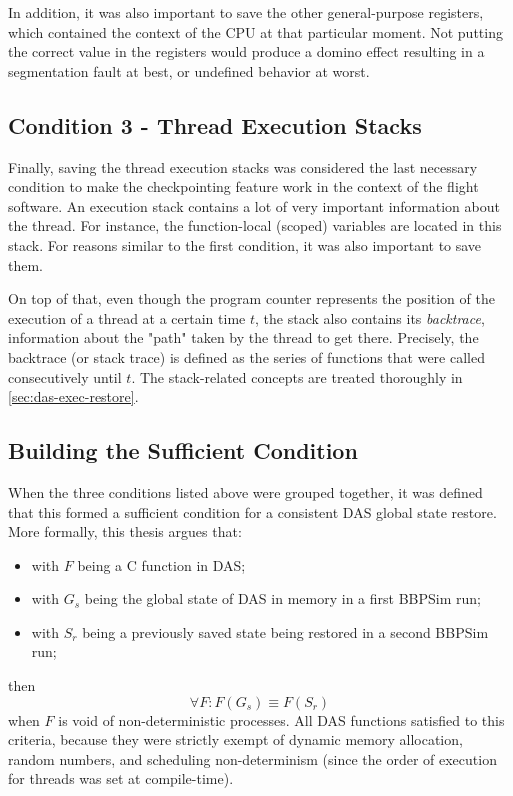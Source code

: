 {In addition, it was also important to save the other general-purpose registers, which contained the context of the CPU at that particular moment. Not putting the correct value in the registers would produce a domino effect resulting in a segmentation fault at best, or undefined behavior at worst.

\subsection*{Condition 3 - Thread Execution Stacks}
Finally, saving the thread execution stacks was considered the last necessary condition to make the checkpointing feature work in the context of the flight software. An execution stack contains a lot of very important information about the thread. For instance, the function-local (scoped) variables are located in this stack. For reasons similar to the first condition, it was also important to save them.

On top of that, even though the program counter represents the position of the execution of a thread at a certain time $t$, the stack also contains its \textit{backtrace}, information about the "path" taken by the thread to get there. Precisely, the backtrace (or stack trace) is defined as the series of functions that were called consecutively until $t$. The stack-related concepts are treated thoroughly in \autoref{sec:das-exec-restore}.

\subsection*{Building the Sufficient Condition}
When the three conditions listed above were grouped together, it was defined that this formed a sufficient condition for a consistent DAS global state restore. More formally, this thesis argues that:
\begin{itemize}
	\item with $F$ being a C function in DAS;
	\item with $G_s$ being the global state of DAS in memory in a first BBPSim run;
	\item with $S_r$ being a previously saved state being restored in a second BBPSim run;
\end{itemize}
then
\begin{equation} \label{eq:sr_equiv}
	\forall F: F(G_s)\equiv F(S_r)
\end{equation}
when $F$ is void of non-deterministic processes. All DAS functions satisfied to this criteria, because they were strictly exempt of dynamic memory allocation, random numbers, and scheduling non-determinism (since the order of execution for threads was set at compile-time).

}
